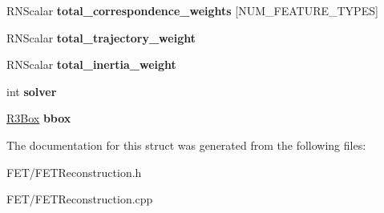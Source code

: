 \begin{DoxyCompactItemize}
\item 
R\+N\+Scalar {\bfseries total\+\_\+correspondence\+\_\+weights} \mbox{[}N\+U\+M\+\_\+\+F\+E\+A\+T\+U\+R\+E\+\_\+\+T\+Y\+P\+ES\mbox{]}\hypertarget{struct_f_e_t_reconstruction_ae86cec25723d94578071c4e78cf331d3}{}\label{struct_f_e_t_reconstruction_ae86cec25723d94578071c4e78cf331d3}

\item 
R\+N\+Scalar {\bfseries total\+\_\+trajectory\+\_\+weight}\hypertarget{struct_f_e_t_reconstruction_ac71446e7d1186daeea2fdc50698adde9}{}\label{struct_f_e_t_reconstruction_ac71446e7d1186daeea2fdc50698adde9}

\item 
R\+N\+Scalar {\bfseries total\+\_\+inertia\+\_\+weight}\hypertarget{struct_f_e_t_reconstruction_ae9db6aa8cc9a0b20b286ad6bbce92263}{}\label{struct_f_e_t_reconstruction_ae9db6aa8cc9a0b20b286ad6bbce92263}

\item 
int {\bfseries solver}\hypertarget{struct_f_e_t_reconstruction_adb0109aae6e2e9f6f1939a7eb8255494}{}\label{struct_f_e_t_reconstruction_adb0109aae6e2e9f6f1939a7eb8255494}

\item 
\hyperlink{class_r3_box}{R3\+Box} {\bfseries bbox}\hypertarget{struct_f_e_t_reconstruction_a98e78a83c987048354293de07efcd6da}{}\label{struct_f_e_t_reconstruction_a98e78a83c987048354293de07efcd6da}

\end{DoxyCompactItemize}


The documentation for this struct was generated from the following files\+:\begin{DoxyCompactItemize}
\item 
F\+E\+T/F\+E\+T\+Reconstruction.\+h\item 
F\+E\+T/F\+E\+T\+Reconstruction.\+cpp\end{DoxyCompactItemize}
